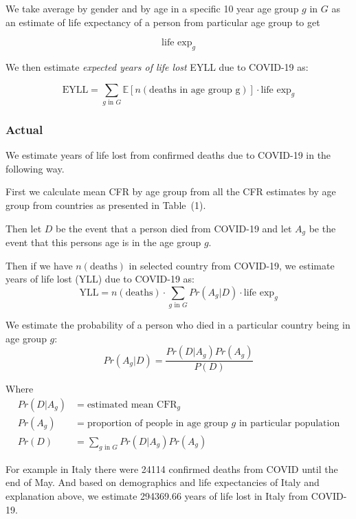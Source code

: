 \documentclass[12pt]{article}
\begin{document}
We take average by gender and by age in a specific 10 year age group $g \text{ in } G$ as an estimate of life expectancy of a person from particular age group to get 

\begin{equation*}
	\text{life exp}_g
\end{equation*}


We then estimate {\it expected years of life lost} EYLL due to COVID-19 as:

\begin{equation*}
	\text{EYLL} = 
	\sum_{g \text{ in } G}
	\mathbb{E} \left[  n(\text{deaths in age group g}) \right] \cdot \text{life exp}_g
\end{equation*}

\subsubsection*{Actual}
We estimate years of life lost from confirmed deaths due to COVID-19 in the following way. 

First we calculate mean CFR by age group from all the CFR estimates by age group from countries as presented in Table~(1).

Then let $D$ be the event that a person died from COVID-19 and let $A_g$ be the event that this persons age is in the age group $g$.

Then if we have $n(\text{deaths})$ in selected country from COVID-19, we estimate years of life lost (YLL) due to COVID-19 as:
\begin{equation*}
	\text{YLL} = n(\text{deaths}) \cdot \sum_{g \text{ in } G} Pr(A_g | D) \cdot \text{life exp}_g
\end{equation*}

We estimate the probability of a person who died in a particular country being in age group $g$:
\begin{equation*}
Pr(A_g | D) = \frac{Pr(D | A_g) Pr(A_g)}{P(D)}
\end{equation*}

Where
\begin{align*}
Pr(D | A_g) &= \text{estimated mean } \text{CFR}_g \\
Pr(A_g) &= \text{proportion of people in age group } g \text{ in particular population} \\
Pr(D) &= \sum_{g \text{ in } G} Pr(D | A_g) Pr(A_g)
\end{align*}

For example in Italy there were 24114 confirmed deaths from COVID until the end of May. And based on demographics and life expectancies of Italy and explanation above, we estimate 294369.66 years of life lost in Italy from COVID-19.
\end{document}
